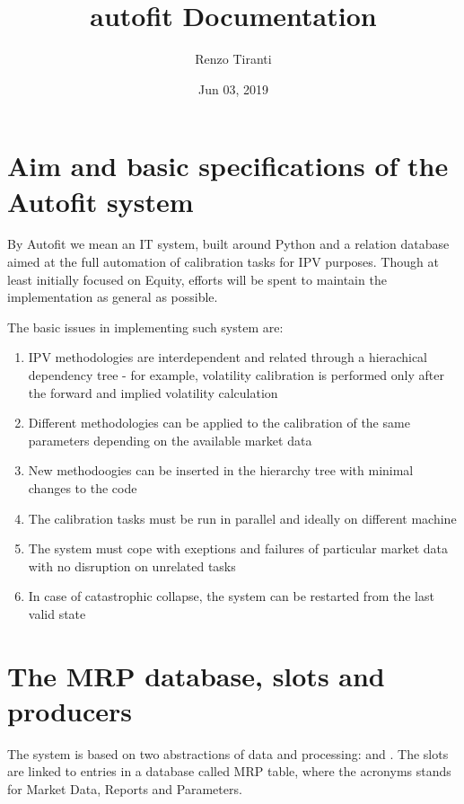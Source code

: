 \documentclass[letterpaper,10pt,english]{sphinxmanual}
\title{autofit Documentation}
\date{Jun 03, 2019}
\author{Renzo Tiranti}
\begin{document}
\maketitle
\sphinxtableofcontents
{}\label{\detokenize{index::doc}}



\chapter{Aim and basic specifications of the Autofit system}
\label{\detokenize{intro:aim-and-basic-specifications-of-the-autofit-system}}\label{\detokenize{intro::doc}}\label{\detokenize{intro:welcome-to-autofit-documentation-s-documentation}}
By Autofit we mean an IT system, built around Python and a relation database aimed at the full automation
of calibration tasks for IPV purposes. Though at least initially focused on Equity, efforts will be spent to
maintain the implementation as general as possible.

The basic issues in implementing such system are:
\begin{enumerate}
\item {} 
IPV methodologies are interdependent and related through a hierachical dependency tree - for example, volatility calibration is performed only after the forward and implied volatility calculation

\item {} 
Different methodologies can be applied to the calibration of the same parameters depending on the available market data

\item {} 
New methodoogies can be inserted in the hierarchy tree with minimal changes to the code

\item {} 
The calibration tasks must be run in parallel and ideally on different machine

\item {} 
The system must cope with exeptions and failures of particular market data with no disruption on unrelated tasks

\item {} 
In case of catastrophic collapse, the system can be restarted from the last valid state

\end{enumerate}


\chapter{The MRP database, slots and producers}
\label{\detokenize{slot_prod::doc}}\label{\detokenize{slot_prod:the-mrp-database-slots-and-producers}}
The system is based on two abstractions of data and processing:  and .
The slots are linked to entries in a database called MRP table, where the acronyms
stands for Market Data, Reports and Parameters.
\end{document}
